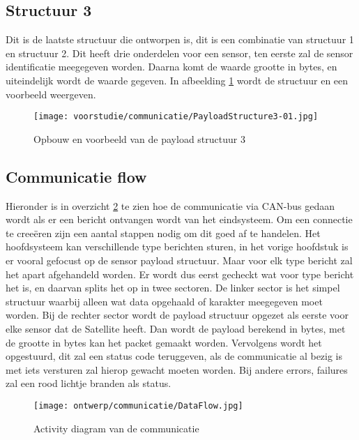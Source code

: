 \subsection{Structuur 3}
Dit is de laatste structuur die ontworpen is, dit is een combinatie van structuur 1 en structuur 2. Dit heeft drie onderdelen voor een sensor, ten eerste zal de sensor identificatie meegegeven worden. Daarna komt de waarde grootte in bytes, en uiteindelijk wordt de waarde gegeven. In afbeelding \ref{fig:Structure3} wordt de structuur en een voorbeeld weergeven.
\begin{figure}[h!]
	\label{fig:Structure3}

	\texttt{[image: voorstudie/communicatie/PayloadStructure3-01.jpg]}
	\caption{Opbouw en voorbeeld van de payload structuur 3}
\end{figure}

\newpage
\subsection{Communicatie flow}
Hieronder is in overzicht \ref{fig:comflow} te zien hoe de communicatie via CAN-bus gedaan wordt als er een bericht ontvangen wordt van het eindsysteem. Om een connectie te creeëren zijn een aantal stappen nodig om dit goed af te handelen. Het hoofdsysteem kan verschillende type berichten sturen, in het vorige hoofdstuk is er vooral gefocust op de sensor payload structuur. Maar voor elk type bericht zal het apart afgehandeld worden. Er wordt dus eerst gecheckt wat voor type bericht het is, en daarvan splits het op in twee sectoren. De linker sector is het simpel structuur waarbij alleen wat data opgehaald of karakter meegegeven moet worden. Bij de rechter sector wordt de payload structuur opgezet als eerste voor elke sensor dat de Satellite heeft. Dan wordt de payload berekend in bytes, met de grootte in bytes kan het packet gemaakt worden. Vervolgens wordt het opgestuurd, dit zal een status code teruggeven, als de communicatie al bezig is met iets versturen zal hierop gewacht moeten worden. Bij andere errors, failures zal een rood lichtje branden als status.
\begin{figure}[h!]
	\centering
	\label{fig:comflow}

	\texttt{[image: ontwerp/communicatie/DataFlow.jpg]}
	\caption{Activity diagram van de communicatie}
\end{figure}

\newpage
